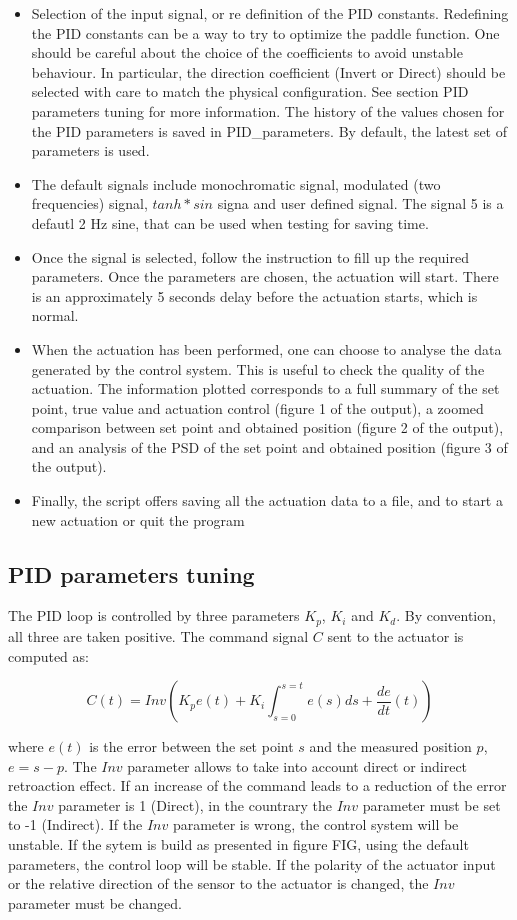 \documentclass[pdftex,a4paper,12pt,onecolumn,fleqn,captions=tableheading]{scrartcl}
\begin{document}
\begin{itemize}
\item Selection of the input signal, or re definition of the PID constants. Redefining the PID constants can be a way to try to optimize the paddle function. One should be careful about the choice of the coefficients to avoid unstable behaviour. In particular, the direction coefficient (Invert or Direct) should be selected with care to match the physical configuration. See section PID parameters tuning for more information. The history of the values chosen for the PID parameters is saved in PID\_parameters. By default, the latest set of parameters is used.
\item The default signals include monochromatic signal, modulated (two frequencies) signal, $tanh * sin$ signa and user defined signal. The signal 5 is a defautl 2 Hz sine, that can be used when testing for saving time.
\item Once the signal is selected, follow the instruction to fill up the required parameters. Once the parameters are chosen, the actuation will start. There is an approximately 5 seconds delay before the actuation starts, which is normal.
\item When the actuation has been performed, one can choose to analyse the data generated by the control system. This is useful to check the quality of the actuation. The information plotted corresponds to a full summary of the set point, true value and actuation control (figure 1 of the output), a zoomed comparison between set point and obtained position (figure 2 of the output), and an analysis of the PSD of the set point and obtained position (figure 3 of the output).
\item Finally, the script offers saving all the actuation data to a file, and to start a new actuation or quit the program
\end{itemize}

\subsection{PID parameters tuning}

The PID loop is controlled by three parameters $K_p$, $K_i$ and $K_d$. By convention, all three are taken positive. The command signal $C$ sent to the actuator is computed as:

$$ C(t) = Inv (K_p e(t) + K_i \int_{s=0}^{s=t} e(s) ds + \frac{d e}{dt} (t))$$

where $e(t)$ is the error between the set point $s$ and the measured position $p$, $e = s - p$. The $Inv$ parameter allows to take into account direct or indirect retroaction effect. If an increase of the command leads to a reduction of the error the $Inv$ parameter is 1 (Direct), in the countrary the $Inv$ parameter must be set to -1 (Indirect). If the $Inv$ parameter is wrong, the control system will be unstable. If the sytem is build as presented in figure FIG, using the default parameters, the control loop will be stable. If the polarity of the actuator input or the relative direction of the sensor to the actuator is changed, the $Inv$ parameter must be changed.
\end{document}
